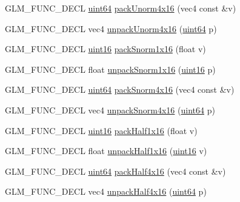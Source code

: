 \begin{DoxyCompactItemize}
\item 
G\+L\+M\+\_\+\+F\+U\+N\+C\+\_\+\+D\+E\+C\+L \hyperlink{group__gtc__type__precision_gae3632bf9b37da66233d78930dd06378a}{uint64} \hyperlink{group__gtc__packing_gac561f06c908b7302537a8ef29fcb409e}{pack\+Unorm4x16} (vec4 const \&v)
\item 
G\+L\+M\+\_\+\+F\+U\+N\+C\+\_\+\+D\+E\+C\+L vec4 \hyperlink{group__gtc__packing_gafb2b502bc406031a5618ce930139a9e3}{unpack\+Unorm4x16} (\hyperlink{group__gtc__type__precision_gae3632bf9b37da66233d78930dd06378a}{uint64} p)
\item 
G\+L\+M\+\_\+\+F\+U\+N\+C\+\_\+\+D\+E\+C\+L \hyperlink{group__gtc__type__precision_gad8c2939e1fdd8e5828b31d95c52255d5}{uint16} \hyperlink{group__gtc__packing_gac29411d6c0f6ed0fe9f0396dfe92e0e8}{pack\+Snorm1x16} (float v)
\item 
G\+L\+M\+\_\+\+F\+U\+N\+C\+\_\+\+D\+E\+C\+L float \hyperlink{group__gtc__packing_ga246f451cebf590726324f7a283e3d65e}{unpack\+Snorm1x16} (\hyperlink{group__gtc__type__precision_gad8c2939e1fdd8e5828b31d95c52255d5}{uint16} p)
\item 
G\+L\+M\+\_\+\+F\+U\+N\+C\+\_\+\+D\+E\+C\+L \hyperlink{group__gtc__type__precision_gae3632bf9b37da66233d78930dd06378a}{uint64} \hyperlink{group__gtc__packing_ga9b237d7c66b7a71964e6d1f4dc06539f}{pack\+Snorm4x16} (vec4 const \&v)
\item 
G\+L\+M\+\_\+\+F\+U\+N\+C\+\_\+\+D\+E\+C\+L vec4 \hyperlink{group__gtc__packing_ga1bfaa3f217fd7a4b6b9d3117ecb3fcac}{unpack\+Snorm4x16} (\hyperlink{group__gtc__type__precision_gae3632bf9b37da66233d78930dd06378a}{uint64} p)
\item 
G\+L\+M\+\_\+\+F\+U\+N\+C\+\_\+\+D\+E\+C\+L \hyperlink{group__gtc__type__precision_gad8c2939e1fdd8e5828b31d95c52255d5}{uint16} \hyperlink{group__gtc__packing_gaba534b320836a35372e00af5771dd1a2}{pack\+Half1x16} (float v)
\item 
G\+L\+M\+\_\+\+F\+U\+N\+C\+\_\+\+D\+E\+C\+L float \hyperlink{group__gtc__packing_gaa6eebcdfc746584b7d1823f1d5344fed}{unpack\+Half1x16} (\hyperlink{group__gtc__type__precision_gad8c2939e1fdd8e5828b31d95c52255d5}{uint16} v)
\item 
G\+L\+M\+\_\+\+F\+U\+N\+C\+\_\+\+D\+E\+C\+L \hyperlink{group__gtc__type__precision_gae3632bf9b37da66233d78930dd06378a}{uint64} \hyperlink{group__gtc__packing_gafe2f7b39caf8f5ec555e1c059ec530e6}{pack\+Half4x16} (vec4 const \&v)
\item 
G\+L\+M\+\_\+\+F\+U\+N\+C\+\_\+\+D\+E\+C\+L vec4 \hyperlink{group__gtc__packing_gaea526d6491ad40401eac34803984bf27}{unpack\+Half4x16} (\hyperlink{group__gtc__type__precision_gae3632bf9b37da66233d78930dd06378a}{uint64} p)

\end{DoxyCompactItemize}
